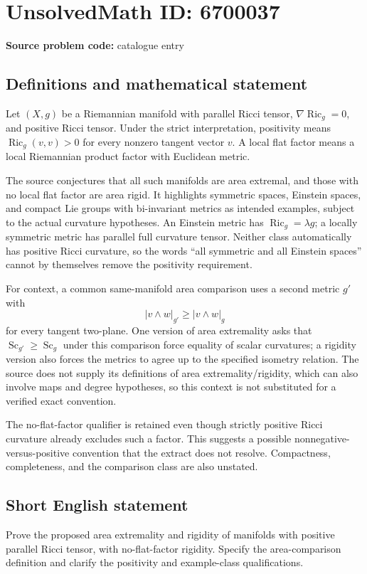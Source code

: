\documentclass[11pt]{article}
\begin{document}
\section*{UnsolvedMath ID: 6700037}
\textbf{Source problem code:} catalogue entry
\subsection{Definitions and mathematical statement}
Let $(X,g)$ be a Riemannian manifold with parallel Ricci tensor, $\nabla\operatorname{Ric}_g=0$, and positive Ricci tensor. Under the strict interpretation, positivity means $\operatorname{Ric}_g(v,v)>0$ for every nonzero tangent vector $v$. A local flat factor means a local Riemannian product factor with Euclidean metric.

The source conjectures that all such manifolds are area extremal, and those with no local flat factor are area rigid. It highlights symmetric spaces, Einstein spaces, and compact Lie groups with bi-invariant metrics as intended examples, subject to the actual curvature hypotheses. An Einstein metric has $\operatorname{Ric}_g=\lambda g$; a locally symmetric metric has parallel full curvature tensor. Neither class automatically has positive Ricci curvature, so the words ``all symmetric and all Einstein spaces'' cannot by themselves remove the positivity requirement.

For context, a common same-manifold area comparison uses a second metric $g'$ with
\[
|v\wedge w|_{g'}\geq|v\wedge w|_g
\]
for every tangent two-plane. One version of area extremality asks that $\operatorname{Sc}_{g'}\geq\operatorname{Sc}_g$ under this comparison force equality of scalar curvatures; a rigidity version also forces the metrics to agree up to the specified isometry relation. The source does not supply its definitions of area extremality/rigidity, which can also involve maps and degree hypotheses, so this context is not substituted for a verified exact convention.

The no-flat-factor qualifier is retained even though strictly positive Ricci curvature already excludes such a factor. This suggests a possible nonnegative-versus-positive convention that the extract does not resolve. Compactness, completeness, and the comparison class are also unstated.
\subsection{Short English statement}
Prove the proposed area extremality and rigidity of manifolds with positive parallel Ricci tensor, with no-flat-factor rigidity. Specify the area-comparison definition and clarify the positivity and example-class qualifications.
\end{document}
